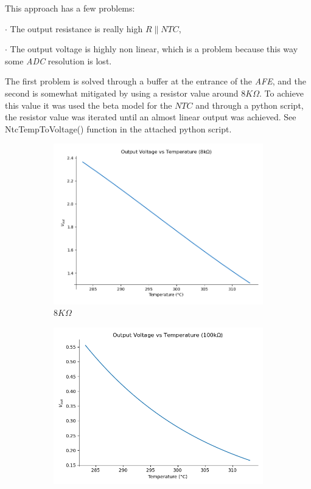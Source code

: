 \documentclass[12pt]{article}
\begin{document}
    This approach  has a few problems: 

    $\cdot$ The output resistance is really high $R\parallel NTC$, 

    $\cdot$ The output voltage is highly non linear, which is a problem because this way some \textit{ADC} resolution is lost.

    The first problem is solved through a buffer at the entrance of the \textit{AFE}, 
    and the second is somewhat mitigated by using a resistor value around $8K \Omega$.
    To achieve this value it was used the beta model for the $NTC$ and through a python script,
    the resistor value was iterated until an almost linear output was achieved. 
    See NtcTempToVoltage() function in the attached python script.  
    
    \begin{figure}[h]
        \centering
        \begin{subfigure}{0.45\textwidth}
            \centering
            \includegraphics[width=\textwidth]{images/VoutPorTemp.png}
            \caption{ $8K\Omega$ }
        \end{subfigure}\hfill
        \begin{subfigure}{0.45\textwidth}
            \centering
            \includegraphics[width=\textwidth]{images/VoutPorTemp100k.png}

\end{subfigure}
\end{figure}
\end{document}
